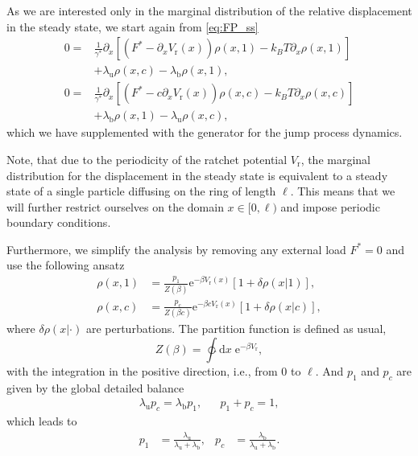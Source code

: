 \documentclass[aps,pre,twocolumn,showpacs,showkeys,superscriptaddress,floatfix]{revtex4-1}
\newcommand{\rmd}{{\mathrm d}}
\newcommand{\rme}{{\mathrm e}}
\begin{document}
As we are interested only in the marginal distribution of the relative displacement in the steady state, we start again from \eqref{eq:FP_ss} 
\begin{equation}
\begin{aligned}
0 =& \frac{1}{\gamma^*} \partial_x \left[ \left( F^* - \partial_x V_\text{r}(x) \right) \rho(x,1) - k_B T \partial_x \rho(x,1) \right] \\
&+ \lambda_\text{u} \rho(x,c) - \lambda_\text{b} \rho(x,1) , \\
0 =& \frac{1}{\gamma^*} \partial_x \left[ \left( F^* - c \partial_x V_\text{r}(x) \right) \rho(x,c) - k_B T \partial_x \rho(x,c) \right] \\
&+ \lambda_\text{b} \rho(x,1) - \lambda_\text{u} \rho(x,c) ,
\end{aligned}
\label{eq:diffusion_on_ring}
\end{equation}
which we have supplemented with the generator for the jump process dynamics.

Note, that due to the periodicity of the ratchet potential $V_\text{r}$, 
the marginal distribution for the displacement in the steady state is equivalent to a steady state of a single particle diffusing on the ring of length $\ell$. 
This means that we will further restrict ourselves on the domain $x \in [ 0 , \ell )$ and impose periodic boundary conditions. 

Furthermore, we simplify the analysis by removing any external load $F^* = 0$ and use the following ansatz
\begin{equation}
\begin{aligned}
\rho(x,1) &= \frac{p_1}{Z(\beta)} \rme^{- \beta V_\text{r}(x) } \left[ 1 + \delta \rho(x|1) \right] , \\
\rho(x,c) &= \frac{p_c}{Z(\beta c)} \rme^{- \beta c V_\text{r}(x) } \left[ 1 + \delta \rho(x|c) \right] , 
\end{aligned}
\label{eq:ring_ansatz}
\end{equation}
where $\delta \rho(x|\cdot)$ are perturbations.
The partition function is defined as usual,  
\[
Z(\beta) = \ointctrclockwise \rmd x \; \rme^{-\beta V_\text{r} },
\]
with the integration in the positive direction, i.e., from $0$ to $\ell$. 
And $p_1$ and $p_c$ are given by the global detailed balance 
\begin{align*}
\lambda_\text{u} p_c = \lambda_\text{b} p_1 , && p_1 + p_c = 1 , 
\end{align*}
which leads to
\begin{align*}
p_1 &= \frac{\lambda_\text{u}}{ \lambda_\text{u} + \lambda_\text{b} } , &
p_c &= \frac{\lambda_\text{b}}{ \lambda_\text{u} + \lambda_\text{b} } . 
\end{align*}
\end{document}
